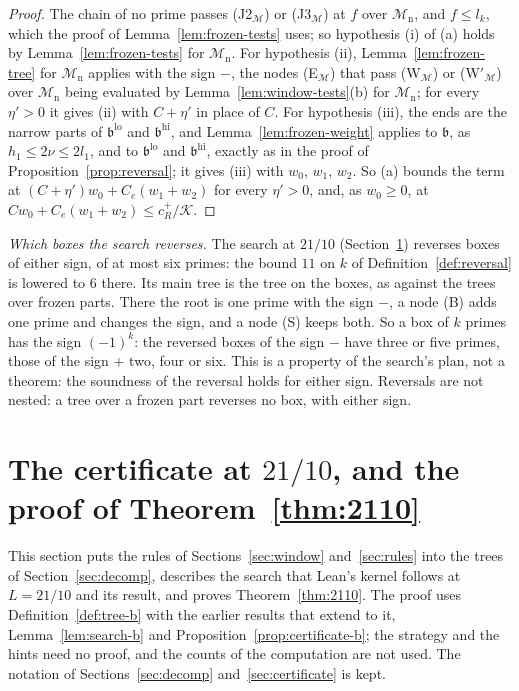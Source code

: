 \documentclass[11pt]{article}
\theoremstyle{definition}
\begin{document}
\begin{proof}
The chain of no prime passes (J2$_{\mathcal M}$) or (J3$_{\mathcal M}$) at $f$ over $\mathcal M_{\mathrm n}$, and $f
\le l_k$, which the proof of Lemma~\ref{lem:frozen-tests} uses; so hypothesis (i) of (a) holds by
Lemma~\ref{lem:frozen-tests} for
$\mathcal M_{\mathrm n}$. For hypothesis (ii), Lemma~\ref{lem:frozen-tree} for $\mathcal M_{\mathrm n}$ applies with
the sign
$-$, the nodes (E$_{\mathcal M}$) that pass (W$_{\mathcal M}$) or (W$'_{\mathcal M}$) over $\mathcal M_{\mathrm n}$
being evaluated by Lemma~\ref{lem:window-tests}(b) for $\mathcal M_{\mathrm n}$; for every $\eta' > 0$ it gives (ii)
with $C + \eta'$ in place of $C$. For hypothesis (iii), the ends are the narrow parts of $\mathfrak b^{\mathrm{lo}}$ and
$\mathfrak b^{\mathrm{hi}}$, and Lemma~\ref{lem:frozen-weight} applies to $\mathfrak b$, as $h_1 \le 2\nu \le 2l_1$,
and to $\mathfrak b^{\mathrm{lo}}$ and $\mathfrak b^{\mathrm{hi}}$, exactly as in the proof of
Proposition~\ref{prop:reversal}; it gives (iii) with $w_0$, $w_1$, $w_2$. So (a) bounds the term at
$(C + \eta') w_0 + C_e(w_1 + w_2)$ for every $\eta' > 0$, and, as $w_0 \ge 0$, at $C w_0 + C_e(w_1 + w_2) \le
c_R^+/\mathcal K$.
\end{proof}

\emph{Which boxes the search reverses.} The search at $21/10$ (Section~\ref{sec:certificate-b}) reverses boxes of either
sign, of at most six primes: the bound $11$ on $k$ of Definition~\ref{def:reversal} is lowered to $6$ there. Its main
tree is the tree on the boxes, as against the trees over frozen parts. There the root is one prime with the sign $-$, a
node (B) adds one prime and changes the sign, and a node (S) keeps both. So a box of $k$ primes has the sign $(-1)^k$:
the reversed boxes of the sign $-$ have three or five primes, those of the sign $+$ two, four or six. This is a property
of the search's plan, not a theorem: the soundness of the reversal holds for either sign. Reversals are not nested: a
tree over a frozen part reverses no box, with either sign.

\section{The certificate at \texorpdfstring{$21/10$}{21/10}, and the proof of
Theorem~\ref{thm:2110}}\label{sec:certificate-b}

This section puts the rules of Sections~\ref{sec:window} and~\ref{sec:rules} into the trees of
Section~\ref{sec:decomp}, describes the search that Lean's kernel follows at $L = 21/10$ and its result, and proves
Theorem~\ref{thm:2110}. The proof uses Definition~\ref{def:tree-b} with the earlier results that extend to it,
Lemma~\ref{lem:search-b} and Proposition~\ref{prop:certificate-b}; the strategy and the hints need no proof, and the
counts of the computation are not used. The notation of Sections~\ref{sec:decomp} and~\ref{sec:certificate} is kept.
\end{document}
